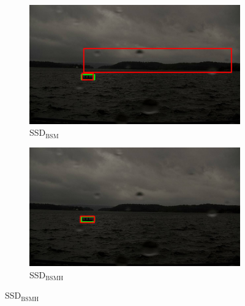 \begin{figure}[h!]
\begin{subfigure}{.5\textwidth}
  \centering
  \includegraphics[width=0.9\linewidth]{results/case_buildings/bigbox_bcbf/SSD2/selected_06_14_axis0019.jpg}
  \caption{SSD$_{\text{BSM}}$}
  \label{fig:sfig1}
\end{subfigure}%
\begin{subfigure}{.5\textwidth}
  \centering
  \includegraphics[width=.9\linewidth]{results/case_buildings/bigbox_bcbf/SSD3/selected_06_14_axis0019.jpg}
  \caption{SSD$_{\text{BSMH}}$}
  \label{fig:sfig2}
\end{subfigure}


\end{figure}

